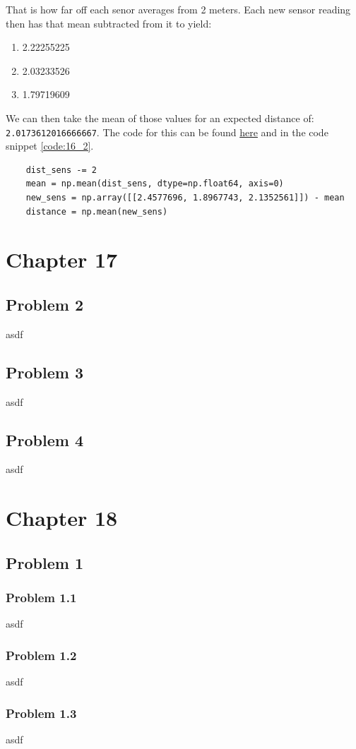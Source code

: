 \documentclass{article}
\begin{document}
That is how far off each senor averages from 2 meters. Each new sensor reading 
then has that mean subtracted from it to yield:

\begin{enumerate}[label=\Alph*]
    \item 2.22255225
    \item 2.03233526
    \item 1.79719609
\end{enumerate}

We can then take the mean of those values for an expected distance of: 
\texttt{2.0173612016666667}. The code for this can be found 
\href{}{here} 
and in the code snippet \ref{code:16_2}.

\begin{code}
\label{code:16_2}
\begin{verbatim}
    dist_sens -= 2
    mean = np.mean(dist_sens, dtype=np.float64, axis=0)
    new_sens = np.array([[2.4577696, 1.8967743, 2.1352561]]) - mean
    distance = np.mean(new_sens)
\end{verbatim}
\end{code}


\newpage
\section{\textbf{Chapter 17}}
\subsection{Problem 2}
asdf


\subsection{Problem 3}
asdf


\subsection{Problem 4}
asdf



\newpage
\section{\textbf{Chapter 18}}
\subsection{Problem 1}
\subsubsection{Problem 1.1}
asdf


\subsubsection{Problem 1.2}
asdf


\subsubsection{Problem 1.3}
asdf
\end{document}
